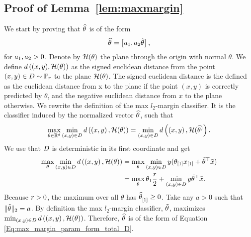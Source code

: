 \subsection{Proof of Lemma~\ref{lem:maxmargin}}
\label{sec:maxmarginproof}


We start by proving that $\widehat{\theta}^{}$ is of the form
\begin{equation}
\label{Eq:max_margin_param_form_total_D}
\widehat{\theta}^{} = \left[a_1, a_2 \tilde{\theta} \right],
\end{equation}
for $a_1, a_2 > 0$. Denote by $\mathcal{H}(\theta)$ the plane through the origin with normal $\theta$. We define $d\left((x,y), \mathcal{H}(\theta) \right)$ as the signed euclidean distance from the point $(x,y) \in D \sim \mathbb{P}_{r}$ to the plane $\mathcal{H}(\theta)$. The signed euclidean distance is the defined as the euclidean distance from x to the plane if the point $(x,y)$ is correctly predicted by $\theta$, and the negative euclidean distance from $x$ to the plane otherwise. We rewrite the definition of the max $l_2$-margin classifier. It is the classifier induced by the  normalized vector $\widehat{\theta}^{}$, such that 
\begin{equation*}
\max_{\theta \in \mathbb{R}^{d}} \min_{(x,y) \in D}d\left( \left(x,y\right),\mathcal{H}(\theta)\right)  = \min_{(x,y) \in D} d\left( \left(x,y \right),\mathcal{H}(\widehat{\theta}^{)}\right).
\end{equation*}
We use that $D$ is deterministic in its first coordinate and get
\begin{equation*}
\begin{split}
	\max_{\theta}\min_{(x,y) \in D}d\left(\left(x,y\right), \mathcal{H}(\theta) \right) &= \max_{\theta}\min_{(x,y) \in D} y (\theta_{[1]} x_{[1]} + \tilde{\theta}^{\top} \tilde{x})\\
	&= \max_{\theta}  \theta_1  \frac{r}{2} + \min_{(x,y) \in D}  y \tilde{\theta}^{\top} \Tilde{x}.
	\end{split}
\end{equation*}
Because $r >0$, the maximum over all $\theta$ has $\widehat{\theta}_{[1]}^{} \geq 0$. Take any $a > 0$ such that $\|\tilde{\theta}\|_2 = a$.  By definition the max $l_2$-margin classifier, $\tilde{\theta}$, maximizes $\min_{(x,y) \in D} d\left(\left(x,y\right), \mathcal{H}(\theta) \right)$. Therefore, $\widehat{\theta}^{}$ is of the form of Equation \eqref{Eq:max_margin_param_form_total_D}. 

